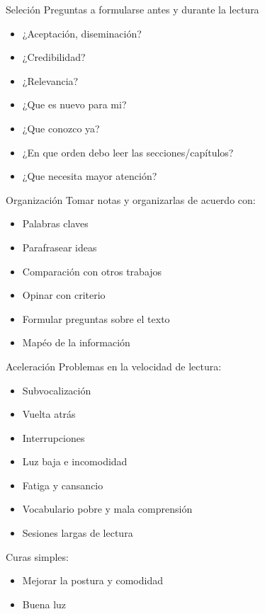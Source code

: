 \documentclass[
10pt,
aspectratio=169,
]{beamer}
\begin{document}
\begin{frame}[c]{Seleci\'on}
Preguntas a formularse antes y durante la lectura
\begin{itemize}
\item ¿Aceptaci\'on, diseminaci\'on?
\item ¿Credibilidad?
\item ¿Relevancia?
\item ¿Que es nuevo para mi?
\item ¿Que conozco ya?
\item ¿En que orden debo leer las secciones/cap\'itulos?
\item ¿Que necesita mayor atenci\'on?
\end{itemize}
\end{frame}


\begin{frame}[c]{Organizaci\'on}
Tomar notas y organizarlas de acuerdo con:
\begin{itemize}
\item Palabras claves
\item Parafrasear ideas
\item Comparaci\'on con otros trabajos
\item Opinar con criterio
\item Formular preguntas sobre el texto
\item Map\'eo de la informaci\'on
\end{itemize}
\end{frame}

\begin{frame}[c]{Aceleraci\'on}
Problemas en la velocidad de lectura:
\begin{itemize}
\item Subvocalizaci\'on
\item Vuelta atr\'as
\item Interrupciones
\item Luz baja e incomodidad
\item Fatiga y cansancio
\item Vocabulario pobre y mala comprensi\'on
\item Sesiones largas de lectura
\end{itemize}
Curas simples:
\begin{itemize}
\item Mejorar la postura y comodidad
\item Buena luz
\end{itemize}
\end{frame}
\end{document}
